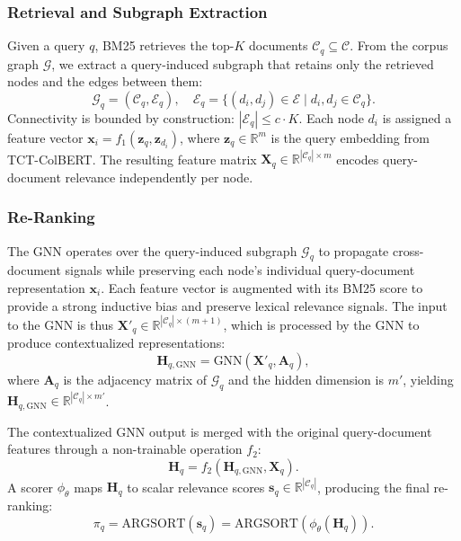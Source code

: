 \documentclass[runningheads]{llncs}
\begin{document}
\subsubsection*{\textbf{Retrieval and Subgraph Extraction}}
Given a query $q$, BM25 \cite{bm25} retrieves the top-$K$ documents $\mathcal{C}_q \subseteq \mathcal{C}$. From the corpus graph $\mathcal{G}$, we extract a query-induced subgraph that retains only the retrieved nodes and the edges between them:
\begin{equation} \label{eq:subgraph}
    \mathcal{G}_{q} = (\mathcal{C}_q, \mathcal{E}_q), \quad \mathcal{E}_q = \{(d_i,d_j) \in \mathcal{E} \;|\; d_i,d_j \in \mathcal{C}_q\}.
\end{equation}
Connectivity is bounded by construction: $|\mathcal{E}_q| \leq c \cdot K$. Each node $d_i$ is assigned a feature vector $\mathbf{x}_i = f_1(\mathbf{z}_{q}, \mathbf{z}_{d_i})$, where $\mathbf{z}_{q} \in \mathbb{R}^m$ is the query embedding from TCT-ColBERT. The resulting feature matrix $\mathbf{X}_q \in \mathbb{R}^{|\mathcal{C}_q| \times m}$ encodes query-document relevance independently per node.

\subsubsection*{\textbf{Re-Ranking}}
The GNN operates over the query-induced subgraph $\mathcal{G}_q$ to propagate cross-document signals while preserving each node's individual query-document representation $\mathbf{x}_i$. Each feature vector is augmented with its BM25 score to provide a strong inductive bias and preserve lexical relevance signals. The input to the GNN is thus $\mathbf{X'}_q \in \mathbb{R}^{|\mathcal{C}_q| \times (m+1)}$, which is processed by the GNN to produce contextualized representations:
\begin{equation}
\label{eq:local_interactions}
    \mathbf{H}_{q,\text{GNN}} = \text{GNN}(\mathbf{X'}_q, \mathbf{A}_q),
\end{equation}
where $\mathbf{A}_q$ is the adjacency matrix of $\mathcal{G}_q$ and the hidden dimension is $m'$, yielding $\mathbf{H}_{q,\text{GNN}} \in \mathbb{R}^{|\mathcal{C}_q| \times m'}$.

The contextualized GNN output is merged with the original query-document features through a non-trainable operation $f_2$:
\begin{equation}
    \mathbf{H}_q = f_2\left(\mathbf{H}_{q,\text{GNN}}, \mathbf{X}_q\right).
\end{equation}
A scorer $\phi_{\theta}$ maps $\mathbf{H}_q$ to scalar relevance scores $\mathbf{s}_q \in \mathbb{R}^{|\mathcal{C}_q|}$, producing the final re-ranking:
\begin{equation}
    \pi_q = \text{ARGSORT}(\mathbf{s}_q) = \text{ARGSORT}(\phi_{\theta}(\mathbf{H}_q)).
\end{equation}
\end{document}
